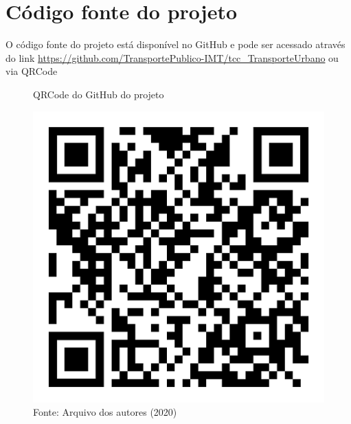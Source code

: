 \section{Código fonte do projeto}
O código fonte do projeto está disponível no GitHub e pode ser acessado através do link \url{https://github.com/TransportePublico-IMT/tcc_TransporteUrbano} ou via QRCode
\begin{figure}[H]
    \centering
    \caption{QRCode do GitHub do projeto}
    \includegraphics[width=0.3\linewidth]{Imagens/qr-code.png}
    \caption*{Fonte: Arquivo dos autores (2020)}
    \label{QRCodeGitHub}
\end{figure}